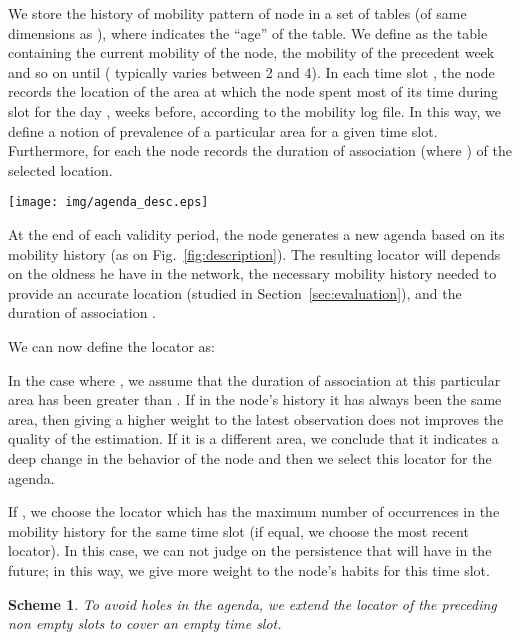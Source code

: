 \documentclass[a4paper]{sig-alternate-10pt}
\newtheorem{scheme}{Scheme}
\begin{document}
We store the history of mobility pattern of node  in a set of
tables  (of same dimensions as ), where 
indicates the ``age'' of the table. We define  as the table
containing the current mobility of the node,  the mobility of
the precedent week and so on until  (
typically varies between 2 and 4). In each time slot ,
the node records the location of the area at which the node spent
most of its time during slot  for the day ,  weeks before,
according to the mobility log file. In this way, we define a notion
of prevalence of a particular area for a given time slot.
Furthermore, for each  the node records the duration of
association  (where ) of the
selected location.


\begin{figure*}[t]
 \centering
 \texttt{[image: img/agenda\_desc.eps]}
 \caption{Example of a simplified agenda of associations.}
\label{fig:description}
\end{figure*}

At the end of each validity period, the node generates a new agenda
based on its mobility history (as on Fig.~\ref{fig:description}).
The resulting locator  will depends on the oldness he have
in the network, the necessary mobility history needed to provide an
accurate location  (studied in
Section~\ref{sec:evaluation}), and the duration of association
.

We can now define the locator  as:



In the case where , we assume that the duration of
association at this particular area has been greater than . If in
the node's history it has always been the same area, then giving a
higher weight to the latest observation does not improves the
quality of the estimation. If it is a different area, we conclude
that it indicates a deep change in the behavior of the node and then
we select this locator for the agenda.

If , we choose the locator which has the maximum
number of occurrences in the mobility history for the same time slot
(if equal, we choose the most recent locator). In this case, we can
not judge on the persistence that  will have in the
future; in this way, we give more weight to the node's habits for
this time slot.

\begin{scheme}
To avoid holes in the agenda, we extend the locator of the preceding
non empty slots to cover an empty time slot.
\end{scheme}
\end{document}
